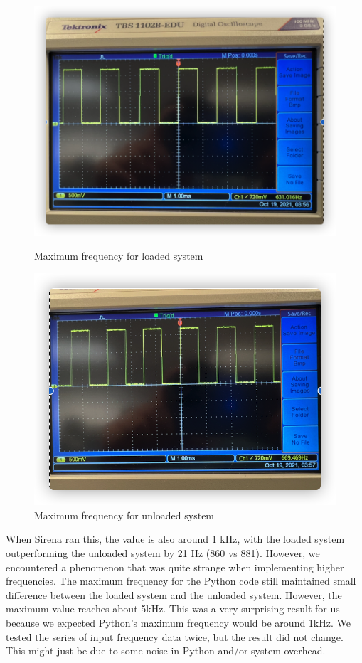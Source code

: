 \documentclass[a4paper,10pt]{article}
\begin{document}
\begin{figure}[H]
\centering
\begin{minipage}{0.5\textwidth}
  \centering
  \includegraphics[width=\linewidth]{Images/python-loaded.png}
  \caption{Maximum frequency for loaded system}
\end{minipage}%
\begin{minipage}{0.5\textwidth}
  \centering
  \includegraphics[width=\linewidth]{Images/pythonn-unloaded.png}
  \caption{Maximum frequency for unloaded system}
\end{minipage}
\end{figure}

When Sirena ran this, the value is also around 1 kHz, with the loaded system outperforming the unloaded system by 21 Hz (860 vs 881). However, we encountered a phenomenon that was quite strange when implementing higher frequencies. The maximum frequency for the Python code still maintained small difference between the loaded system and the unloaded system. However, the maximum value reaches about 5kHz. This was a very surprising result for us because we expected Python's maximum frequency would be around 1kHz. We tested the series of input frequency data twice, but the result did not change. This might just be due to some noise in Python and/or system overhead.
\end{document}
